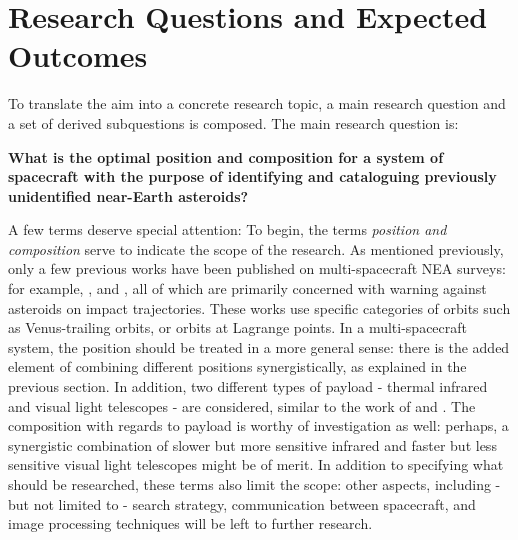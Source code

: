 \section{Research Questions and Expected Outcomes}
\label{sec:researchquestions}

To translate the aim into a concrete research topic, a main research question and a set of derived subquestions is composed. The main research question is:

\begin{center}\large\textbf{What is the optimal position and composition for a system of spacecraft with the purpose of identifying and cataloguing previously unidentified near-Earth asteroids?}\end{center}

A few terms deserve special attention: To begin, the terms \textit{position and composition} serve to indicate the scope of the research. As mentioned previously, only a few previous works have been published on multi-spacecraft NEA surveys: for example, \cite{ThesisOlga}, \cite{LagrangeNEA} and \cite{newasteroidpaper}, all of which are primarily concerned with warning against asteroids on impact trajectories. These works use specific categories of orbits such as Venus-trailing orbits, or orbits at Lagrange points. In a multi-spacecraft system, the position should be treated in a more general sense: there is the added element of combining different positions synergistically, as explained in the previous section. In addition, two different types of payload - thermal infrared and visual light telescopes - are considered, similar to the work of \cite{2017NEOSDT} and \cite{ThesisOlga}. The composition with regards to payload is worthy of investigation as well: perhaps, a synergistic combination of slower but more sensitive infrared and faster but less sensitive visual light telescopes might be of merit. In addition to specifying what should be researched, these terms also limit the scope: other aspects, including - but not limited to - search strategy, communication between spacecraft, and image processing techniques will be left to further research. \\

